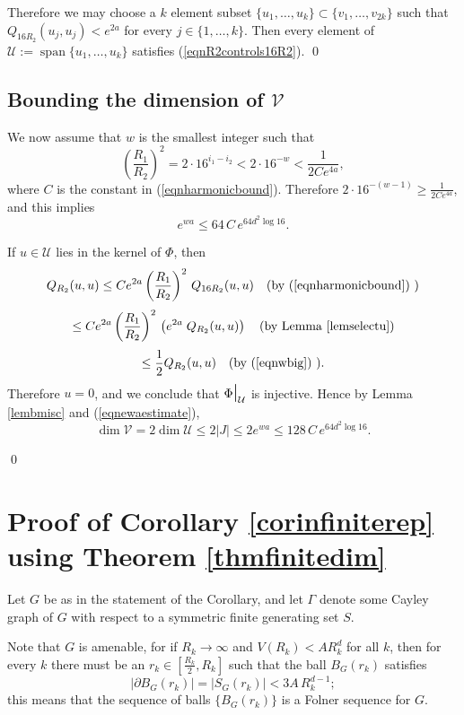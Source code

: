 \documentclass[12pt]{amsart}
\numberwithin{equation}{section}
\theoremstyle{plain}
\theoremstyle{remark}
\theoremstyle{definition}
\newcommand{\ra}{\rightarrow}
\newcommand{\restr}{\mbox{\Large \(|\)\normalsize}}
\newcommand{\D}{{\mathcal D}}
\newcommand{\U}{{\mathcal U}}
\newcommand{\V}{{\mathcal V}}
\renewcommand{\span}{\operatorname{span}}
\def\D{\partial}
\def\Ga{\Gamma}
\def\ra{\rightarrow}
\def\defeq{:=}
\begin{document}
Therefore we may
choose a $k$ element subset 
$\{u_1,\ldots,u_k\}\subset\{v_1,\ldots,v_{2k}\}$ such that
$Q_{16R_2}(u_j,u_j)<e^{2a}$ for every $j\in \{1,\ldots,k\}$.
Then every element of $\U\defeq\span\{u_1,\ldots,u_k\}$ 
satisfies (\ref{eqnR2controls16R2}). 
\qed

\mbox{}
\bigskip
\bigskip


\subsection{Bounding the dimension of $\V$}
We now assume that 
$w$ is the smallest integer such that
\begin{equation}
\label{eqnwbig}
\left(\frac{R_1}{R_2}\right)^2=2\cdot 16^{i_1-i_2}<2\cdot 16^{-w}<
\frac{1}{2Ce^{4a}},
\end{equation}
where $C$ is the constant in (\ref{eqnharmonicbound}).  Therefore
$2\cdot 16^{-(w-1)}\geq \frac{1}{2Ce^{4a}}$, and this implies
\begin{equation}
\label{eqnewaestimate}
e^{wa}\leq 64\,C\,e^{64d^2\log 16}.
\end{equation}

If $u\in \U$ lies in the kernel of $\Phi$, then 
$$
Q_{R_2}(u,u)\leq
Ce^{2a}\left(\frac{R_1}{R_2}\right)^2\,
Q_{16R_2}(u,u)\quad\mbox{(by (\ref{eqnharmonicbound}) )}
$$
$$
\leq 
Ce^{2a}\left(\frac{R_1}{R_2}\right)^2\,\left(e^{2a}\;
Q_{R_2}(u,u)\right)\quad\mbox{(by  Lemma \ref{lemselectu})}
$$
$$
\leq\frac12 Q_{R_2}(u,u)\quad\mbox{(by (\ref{eqnwbig}) )}.
$$
Therefore $u=0$, and we conclude that
$\Phi\restr_{\U}$ is injective.  Hence  by Lemma
\ref{lembmisc}
and (\ref{eqnewaestimate}),
$$
\dim\V=2\dim\U\leq 2|J|\leq 2e^{wa}\leq 128\,C\,e^{64d^2\log 16}.
$$


\qed





\section{Proof of Corollary \ref{corinfiniterep} using 
Theorem \ref{thmfinitedim}}
\label{secinfiniterep}

Let $G$ be as in the statement of the Corollary, 
and let $\Ga$ denote some Cayley graph of $G$ with 
respect to a symmetric finite generating set $S$. 

Note that $G$ is amenable, for if $R_k\ra \infty$
and $V(R_k)<AR_k^d$ for all $k$, then for every $k$
there must be an $r_k\in [\frac{R_k}{2},R_k]$ such
that the ball $B_G(r_k)$ satisfies
$$
|\D B_G(r_k)|=|S_G(r_k)|<3A\,R_k^{d-1};
$$
this means that the sequence of 
balls  $\{B_G(r_k)\}$ is a Folner sequence for $G$.  
\end{document}
